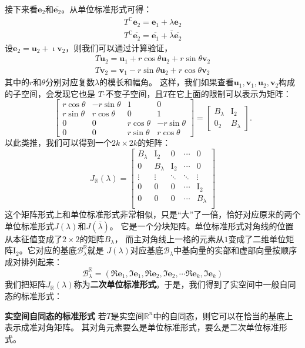 \documentclass[12pt,UTF8,fontset=none]{ctexbook}
\begin{document}
接下来看$\mathbf{e}_2$和$\overline{\mathbf{e}_2}$。从单位标准形式可得：
\begin{align*}
    T^\mathbb{C}\mathbf{e}_2 = \mathbf{e}_1 + \lambda \mathbf{e}_2  \\
    T^\mathbb{C}\overline{\mathbf{e}_2} = \overline{\mathbf{e}_1} + \bar{\lambda} \overline{\mathbf{e}_2} 
\end{align*}
设$\mathbf{e}_2 = \mathbf{u}_2 + \imath \mathbf{v}_2$，则我们可以通过计算验证，
\begin{align*}
    T \mathbf{u}_2 = \mathbf{u}_1 + r\cos\theta \mathbf{u}_2 + r\sin\theta \mathbf{v}_2  \\
    T \mathbf{v}_2 = \mathbf{v}_1 - r\sin\theta \mathbf{u}_2 + r\cos\theta \mathbf{v}_2 
\end{align*}
其中的$r$和$\theta$分别对应复数$\lambda$的模长和幅角。
这样，我们如果查看$\mathbf{u}_1, \mathbf{v}_1, \mathbf{u}_2, \mathbf{v}_2$构成的子空间，会发现它也是
$T$-不变子空间，且$T$在它上面的限制可以表示为矩阵：
$$ \begin{bmatrix}
    r\cos\theta & -r\sin\theta & 1 & 0 \\ r\sin\theta & r\cos\theta & 0 & 1 \\
    0 & 0 & r\cos\theta & -r\sin\theta \\ 0 & 0 & r\sin\theta & r\cos\theta
\end{bmatrix} = \begin{bmatrix}
    B_\lambda & \mathrm{I}_2 \\ 0_2 & B_\lambda
\end{bmatrix}.$$
以此类推，我们可以得到一个$2k \times 2k$的矩阵：
$$ J_\mathbb{R}(\lambda) = \begin{bmatrix}
    B_\lambda & \mathrm{I}_2 & 0 & \cdots & 0 \\
    0 & B_\lambda & \mathrm{I}_2 & \cdots & 0 \\
    \vdots & \vdots & \ddots & \ddots & \vdots  \\
    0 & 0 & 0 & \cdots & \mathrm{I}_2  \\
    0 & 0 & 0 & \cdots & B_\lambda \\
   \end{bmatrix} $$
这个矩阵形式上和单位标准形式非常相似，只是“大”了一倍，恰好对应原来的两个单位标准形式$J(\lambda)$和$J(\bar{\lambda})$。
它是一个分块矩阵。单位标准形式对角线的位置从本征值变成了$2\times 2$的矩阵$B_\lambda$，
而主对角线上一格的元素从$1$变成了二维单位矩阵$\mathrm{I}_2$。它对应的基底$\mathcal{B}_\lambda^\mathbb{R}$就是
$J(\lambda)$对应基底$\mathcal{B}_\lambda$中基向量的实部和虚部向量按顺序成对排列起来：
$$\mathcal{B}_\lambda^\mathbb{R} = (\Re\mathbf{e}_1, \Im\mathbf{e}_1, \Re\mathbf{e}_2, \Im\mathbf{e}_2, \cdots \Re\mathbf{e}_k, \Im\mathbf{e}_k)$$
我们把矩阵$J_\mathbb{R}(\lambda)$称为\textbf{二次单位标准形式}。于是，我们得到了实空间中一般自同态的标准形式：
\begin{pp}\textbf{实空间自同态的标准形式 }\label{pp:9_11}
    若$T$是实空间$\mathbb{R}^n$中的自同态，则它可以在恰当的基底上表示成准对角矩阵。
    其对角元素要么是单位标准形式，要么是二次单位标准形式。
\end{pp}
\end{document}
